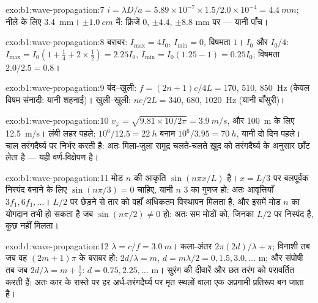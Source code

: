 \begin{solution}{exo:b1:wave-propagation:7}
$i = \lambda D/a = 5.89\times10^{-7} \times 1.5/2.0\times10^{-4} =
\qty{4.4}{mm}$; नीले के लिए \qty{3.4}{mm}। $\pm\qty{1.0}{cm}$ में: फ़्रिंजें
$0$, $\pm 4.4$, $\pm 8.8$ mm पर --- यानी पाँच।
\end{solution}

\begin{solution}{exo:b1:wave-propagation:8}
बराबर: $I_{\max} = 4I_0$, $I_{\min} = 0$, विषमता $1$। $I_0$ और $I_0/4$:
$I_{\max} = I_0(1 + \tfrac14 + 2 \times \tfrac12) = 2.25I_0$, $I_{\min} =
I_0(1.25 - 1) = 0.25I_0$; विषमता $2.0/2.5 = 0.8$।
\end{solution}

\begin{solution}{exo:b1:wave-propagation:9}
बंद--खुली: $f = (2n + 1)c/4L = 170$, $510$, \qty{850}{Hz} (केवल विषम
संनादी: यानी शहनाई)। खुली--खुली: $nc/2L = 340$, $680$,
\qty{1020}{Hz} (यानी बाँसुरी)।
\end{solution}

\begin{solution}{exo:b1:wave-propagation:10}
$v_\varphi = \sqrt{9.81 \times 10/2\pi} = \qty{3.9}{m/s}$, और \qty{100}{m}
के लिए \qty{12.5}{m/s}। लंबी लहर पहले: $10^6/12.5 =
\qty{22}{h}$ बनाम $10^6/3.95 = \qty{70}{h}$, यानी दो दिन पहले। चाल
तरंगदैर्घ्य पर निर्भर करती है: अतः मिला-जुला समुद्र चलते-चलते ख़ुद को
तरंगदैर्घ्य के अनुसार छाँट लेता है --- यही वर्ण-विक्षेपण है।
\end{solution}

\begin{solution}{exo:b1:wave-propagation:11}
मोड $n$ की आकृति $\sin(n\pi x/L)$ है। $x = L/3$ पर बलपूर्वक निस्पंद बनाने के
लिए $\sin(n\pi/3) = 0$ चाहिए, यानी $n$ $3$ का गुणज हो: अतः आवृत्तियाँ $3f_1,
6f_1, \dots$। $L/2$ पर छेड़ने से तार को वहाँ अधिकतम विस्थापन मिलता है, और
इसमें मोड $n$ का योगदान तभी हो सकता है जब $\sin(n\pi/2) \neq 0$ हो: अतः सम
मोडों को, जिनका $L/2$ पर निस्पंद है, कुछ नहीं मिलता।
\end{solution}

\begin{solution}{exo:b1:wave-propagation:12}
$\lambda = c/f = \qty{3.0}{m}$। कला-अंतर $2\pi(2d)/\lambda + \pi$;
विनाशी तब जब वह $(2m + 1)\pi$ के बराबर हो: $2d/\lambda = m$,
$d = m\lambda/2 = 0, 1.5, 3.0, \dots$ m; और संपोषी तब जब $2d/\lambda =
m + \tfrac12$: $d = 0.75, 2.25, \dots$ m। सुरंग की दीवारें और छत तरंग को
परावर्तित करती हैं: अतः कार के रास्ते पर हर अर्ध-तरंगदैर्घ्य पर मृत स्थलों
वाला एक अप्रगामी प्रतिरूप बन जाता है।
\end{solution}

